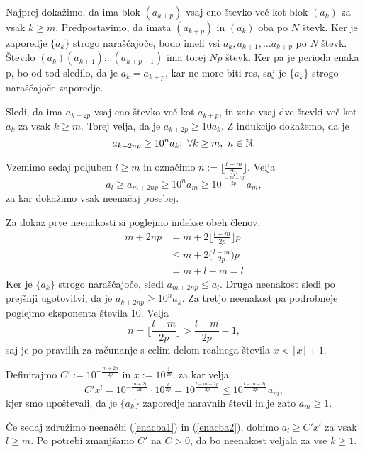 \documentclass[twoside,11pt]{article}
\begin{document}
Najprej dokažimo, da ima blok $(a_{k+p})$ vsaj eno števko več kot blok $(a_k)$ za vsak $k \geq m$.
Predpostavimo, da imata $(a_{k+p})$ in $(a_k)$ oba po $N$ števk. 
Ker je zaporedje $\{a_k\}$ strogo naraščajoče, bodo imeli vsi $a_k, a_{k+1}, \dots a_{k+p}$ po $N$ števk.
Število $(a_k)(a_{k+1})\dots (a_{k+p-1})$ ima torej $Np$ števk. Ker pa je perioda enaka p,
bo od tod sledilo, da je $a_k = a_{k+p}$, kar ne more biti res, saj je $\{a_k\}$ strogo naraščajoče zaporedje.

Sledi, da ima $a_{k+ 2p}$ vsaj eno števko več kot $a_{k+p}$, in zato vsaj dve števki več kot $a_k$
za vsak $k \geq m$.
Torej velja, da je $a_{k+2p} \geq 10 a_k$. Z indukcijo dokažemo, da je 
\[ a_{k+2np} \geq 10^n a_k; \ \forall k \geq m, \ n \in \mathbb{N}.\]

Vzemimo sedaj poljuben $l \geq m$ in označimo $n := \lfloor \frac{l-m}{2p} \rfloor$.
Velja 
\begin{equation}\label{enacba1}
    a_l \geq a_{m+2np} \geq 10^n a_m \geq 10 ^{\frac{l-m-2p}{2p}}a_m,
\end{equation}
za kar dokažimo vsak neenačaj posebej.

Za dokaz prve neenakosti si poglejmo indekse obeh členov. 
\[
    \begin{split}
    m + 2np &= m + 2 \bigg\lfloor \frac{l-m}{2p}\bigg\rfloor p \\
    &\leq m + 2\bigg(\frac{l-m}{2p}\bigg)p \\
    &= m + l - m = l
    \end{split}
    \] 
Ker je $\{a_k\}$ strogo naraščajoče, sledi $a_{m+2np} \leq a_l$.
Druga neenakost sledi po prejšnji ugotovitvi, da je $a_{k+2np} \geq 10^n a_k$.
Za tretjo neenakost pa podrobneje poglejmo eksponenta števila $10$. Velja
\[
    n = \bigg\lfloor \frac{l-m}{2p}\bigg\rfloor > \frac{l-m}{2p} - 1,
     \]
saj je po pravilih za računanje s celim delom realnega števila $x < \lfloor x\rfloor + 1$.

Definirajmo $C' := 10^{-\frac{m + 2p}{2p}}$ in $x := 10^{\frac{1}{2p}}$, za kar velja
\begin{equation}\label{enacba2}
     C'x^l = 10^{-\frac{m + 2p}{2p}} \cdot 10^{\frac{l}{2p}} = 10 ^{\frac{l-m-2p}{2p}}
     \leq 10 ^{\frac{l-m-2p}{2p}} a_m,
\end{equation}
kjer smo upoštevali, da je $\{a_k\}$ zaporedje naravnih števil in je zato $a_m \geq 1$.

Če sedaj združimo neenačbi (\ref{enacba1}) in (\ref{enacba2}), dobimo 
$a_l \geq C'x^l$ za vsak $l \geq m$.
Po potrebi zmanjšamo $C'$ na $C>0$, da bo neenakost veljala
za vse $k \geq 1$.
\end{document}
